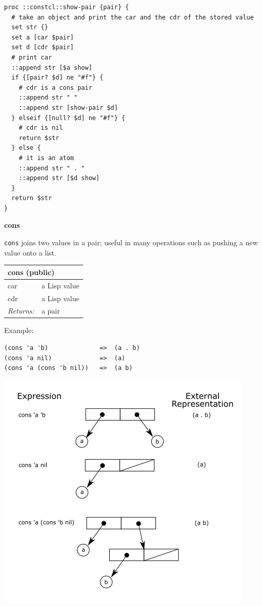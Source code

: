 \documentclass[twoside,9pt]{report}
\begin{document}
\noindent\makebox[\linewidth]{\rule{\linewidth}{0.4pt}}
\begin{lstlisting}
proc ::constcl::show-pair {pair} {
  # take an object and print the car and the cdr of the stored value
  set str {}
  set a [car $pair]
  set d [cdr $pair]
  # print car
  ::append str [$a show]
  if {[pair? $d] ne "#f"} {
    # cdr is a cons pair
    ::append str " "
    ::append str [show-pair $d]
  } elseif {[null? $d] ne "#f"} {
    # cdr is nil
    return $str
  } else {
    # it is an atom
    ::append str " . "
    ::append str [$d show]
  }
  return $str
}
\end{lstlisting}
\noindent\makebox[\linewidth]{\rule{\linewidth}{0.4pt}}

\textbf{cons}


\texttt{cons} joins two values in a pair; useful in many operations such as pushing a new value onto a list.

\begin{tabular}{ |l l| }
\hline
\multicolumn{2}{|l|}{cons (public)} \\
\hline
car & a Lisp value \\
cdr & a Lisp value \\
\textit{Returns:} & a pair \\
\hline
\end{tabular}


Example:

\noindent\makebox[\linewidth]{\rule{\linewidth}{0.4pt}}
\begin{lstlisting}
(cons 'a 'b)              =>  (a . b)
(cons 'a nil)             =>  (a)
(cons 'a (cons 'b nil))   =>  (a b)
\end{lstlisting}
\noindent\makebox[\linewidth]{\rule{\linewidth}{0.4pt}}

\includegraphics{images/consing.png}
\end{document}
